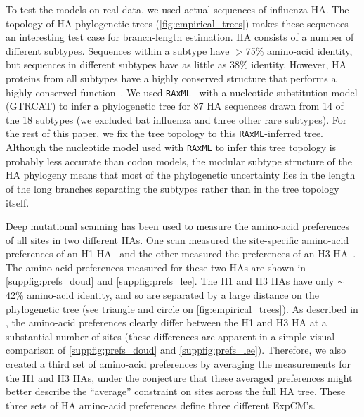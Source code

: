 \documentclass[11pt]{article}
\begin{document}
To test the models on real data, we used actual sequences of influenza HA. 
The topology of HA phylogenetic trees (\ref{fig:empirical_trees}) makes these sequences an interesting test case for branch-length estimation.
HA consists of a number of different subtypes.
Sequences within a subtype have $>$75\% amino-acid identity, but sequences in different subtypes have as little as 38\% identity.
However, HA proteins from all subtypes have a highly conserved structure that performs a highly conserved function~\citep{ha2002h5,russell2004h1}.
We used \texttt{RAxML}~\citep{stamatakis2006raxml} with a nucleotide substitution model  (GTRCAT) to infer a phylogenetic tree for 87 HA sequences drawn from 14 of the 18 subtypes (we excluded bat influenza and three other rare subtypes).
For the rest of this paper, we fix the tree topology to this \texttt{RAxML}-inferred tree.
Although the nucleotide model used with \texttt{RAxML} to infer this tree topology is probably less accurate than codon models, the modular subtype structure of the HA phylogeny means that most of the phylogenetic uncertainty lies in the length of the long branches separating the subtypes rather than in the tree topology itself.

Deep mutational scanning has been used to measure the amino-acid preferences of all sites in two different HAs.
One scan measured the site-specific amino-acid preferences of an H1 HA~\citep{doud2016accurate} and the other measured the preferences of an H3 HA~\citep{lee2018deep}.
The amino-acid preferences measured for these two HAs are shown in \ref{suppfig:prefs_doud} and 
\ref{suppfig:prefs_lee}.
The H1 and H3 HAs have only $\sim$42\% amino-acid identity, and so are separated by a large distance on the phylogenetic tree (see triangle and circle on \ref{fig:empirical_trees}).
As described in \citet{lee2018deep}, the amino-acid preferences clearly differ between the H1 and H3 HA at a substantial number of sites (these differences are apparent in a simple visual comparison of \ref{suppfig:prefs_doud} and 
\ref{suppfig:prefs_lee}).
Therefore, we also created a third set of amino-acid preferences by averaging the measurements for the H1 and H3 HAs, under the conjecture that these averaged preferences might better describe the ``average'' constraint on sites across the full HA tree.
These three sets of HA amino-acid preferences define three different ExpCM's.
  
\end{document}
